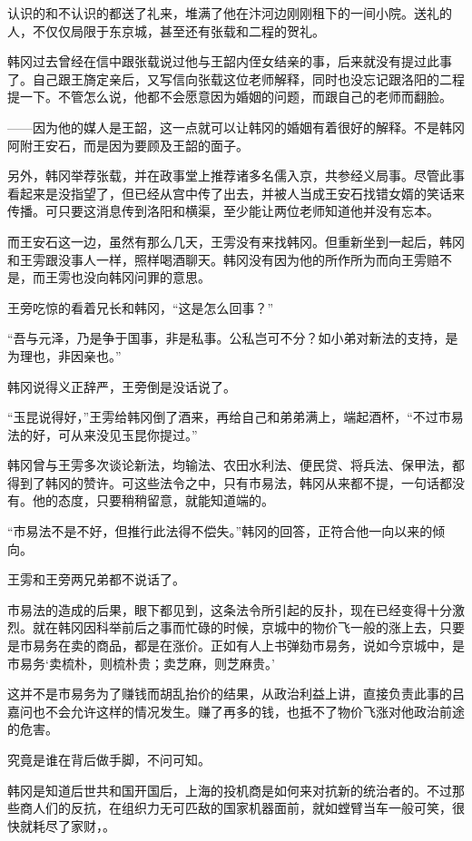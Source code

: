 认识的和不认识的都送了礼来，堆满了他在汴河边刚刚租下的一间小院。送礼的人，不仅仅局限于东京城，甚至还有张载和二程的贺礼。

韩冈过去曾经在信中跟张载说过他与王韶内侄女结亲的事，后来就没有提过此事了。自己跟王旖定亲后，又写信向张载这位老师解释，同时也没忘记跟洛阳的二程提一下。不管怎么说，他都不会愿意因为婚姻的问题，而跟自己的老师而翻脸。

——因为他的媒人是王韶，这一点就可以让韩冈的婚姻有着很好的解释。不是韩冈阿附王安石，而是因为要顾及王韶的面子。

另外，韩冈举荐张载，并在政事堂上推荐诸多名儒入京，共参经义局事。尽管此事看起来是没指望了，但已经从宫中传了出去，并被人当成王安石找错女婿的笑话来传播。可只要这消息传到洛阳和横渠，至少能让两位老师知道他并没有忘本。

而王安石这一边，虽然有那么几天，王雱没有来找韩冈。但重新坐到一起后，韩冈和王雱跟没事人一样，照样喝酒聊天。韩冈没有因为他的所作所为而向王雱赔不是，而王雱也没向韩冈问罪的意思。

王旁吃惊的看着兄长和韩冈，“这是怎么回事？”

“吾与元泽，乃是争于国事，非是私事。公私岂可不分？如小弟对新法的支持，是为理也，非因亲也。”

韩冈说得义正辞严，王旁倒是没话说了。

“玉昆说得好，”王雱给韩冈倒了酒来，再给自己和弟弟满上，端起酒杯，“不过市易法的好，可从来没见玉昆你提过。”

韩冈曾与王雱多次谈论新法，均输法、农田水利法、便民贷、将兵法、保甲法，都得到了韩冈的赞许。可这些法令之中，只有市易法，韩冈从来都不提，一句话都没有。他的态度，只要稍稍留意，就能知道端的。

“市易法不是不好，但推行此法得不偿失。”韩冈的回答，正符合他一向以来的倾向。

王雱和王旁两兄弟都不说话了。

市易法的造成的后果，眼下都见到，这条法令所引起的反扑，现在已经变得十分激烈。就在韩冈因科举前后之事而忙碌的时候，京城中的物价飞一般的涨上去，只要是市易务在卖的商品，都是在涨价。正如有人上书弹劾市易务，说如今京城中，是市易务‘卖梳朴，则梳朴贵；卖芝麻，则芝麻贵。’

这并不是市易务为了赚钱而胡乱抬价的结果，从政治利益上讲，直接负责此事的吕嘉问也不会允许这样的情况发生。赚了再多的钱，也抵不了物价飞涨对他政治前途的危害。

究竟是谁在背后做手脚，不问可知。

韩冈是知道后世共和国开国后，上海的投机商是如何来对抗新的统治者的。不过那些商人们的反抗，在组织力无可匹敌的国家机器面前，就如螳臂当车一般可笑，很快就耗尽了家财，。


